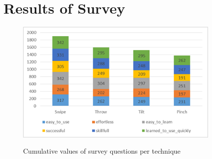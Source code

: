 \section{Results of Survey}

\begin{figure}[H]
	{\includegraphics[width = 1\columnwidth , height = 6cm ]{images/survey-data.png}} 
	\caption{
		Cumulative values of survey questions per technique
	}
	\label{fig:allSetup}
\end{figure}